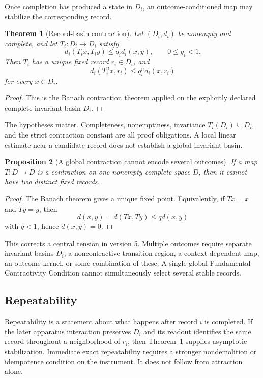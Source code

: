 \documentclass[11pt,a4paper]{article}
\newtheorem{theorem}{Theorem}[section]
\newtheorem{proposition}[theorem]{Proposition}
\theoremstyle{definition}
\theoremstyle{remark}
\begin{document}
Once completion has produced a state in \(D_i\), an outcome-conditioned map
may stabilize the corresponding record.

\begin{theorem}[Record-basin contraction]
\label{thm:basin-contraction}
Let \((D_i,d_i)\) be nonempty and complete, and let
\(T_i:D_i\to D_i\) satisfy
\[
d_i(T_i x,T_i y)\leq q_i d_i(x,y),
\qquad 0\leq q_i<1.
\]
Then \(T_i\) has a unique fixed record \(r_i\in D_i\), and
\[
d_i(T_i^n x,r_i)\leq q_i^n d_i(x,r_i)
\]
for every \(x\in D_i\).
\end{theorem}

\begin{proof}
This is the Banach contraction theorem applied on the explicitly declared
complete invariant basin \(D_i\).
\end{proof}

The hypotheses matter. Completeness, nonemptiness, invariance
\(T_i(D_i)\subseteq D_i\), and the strict contraction constant are all proof
obligations. A local linear estimate near a candidate record does not
establish a global invariant basin.

\begin{proposition}[A global contraction cannot encode several outcomes]
\label{prop:no-global-contraction}
If a map \(T:D\to D\) is a contraction on one nonempty complete space \(D\),
then it cannot have two distinct fixed records.
\end{proposition}

\begin{proof}
The Banach theorem gives a unique fixed point. Equivalently, if
\(Tx=x\) and \(Ty=y\), then
\[
d(x,y)=d(Tx,Ty)\leq qd(x,y)
\]
with \(q<1\), hence \(d(x,y)=0\).
\end{proof}

This corrects a central tension in version 5. Multiple outcomes require
separate invariant basins \(D_i\), a noncontractive transition region, a
context-dependent map, an outcome kernel, or some combination of these. A
single global Fundamental Contractivity Condition cannot simultaneously
select several stable records.

\subsection{Repeatability}

Repeatability is a statement about what happens after record \(i\) is
completed. If the later apparatus interaction preserves \(D_i\) and its
readout identifies the same record throughout a neighborhood of \(r_i\), then
Theorem~\ref{thm:basin-contraction} supplies asymptotic stabilization.
Immediate exact repeatability requires a stronger nondemolition or idempotence
condition on the instrument. It does not follow from attraction alone.
\end{document}

